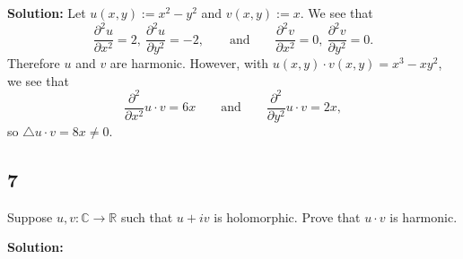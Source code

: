 \documentclass[12pt]{article}
\begin{document}
{\bf Solution:} Let $u(x,y) := x^{2} - y^{2}$ and $v(x,y) := x$. We see that 
\[ \frac{\partial^{2}u}{\partial x^{2}} = 2, \ \frac{\partial^{2}u}{\partial y^{2}} = -2, \qquad \text{and}\qquad 
\frac{\partial^{2}v}{\partial x^{2}} = 0, \ \frac{\partial^{2}v}{\partial y^{2}} = 0. \]
Therefore $u$ and $v$ are harmonic. However, with $u(x,y)\cdot v(x,y) = x^{3} - xy^{2}$, we see that
\[ \frac{\partial^{2}}{\partial x^{2}}u\cdot v = 6x \qquad \text{and}\qquad \frac{\partial^{2}}{\partial y^{2}}u\cdot v = 2x, \]
so $\triangle u\cdot v = 8x \neq 0$.



\subsection*{7}
Suppose $u,v : \mathbb{C} \rightarrow \mathbb{R}$ such that $u + iv$ is holomorphic. Prove that $u\cdot v$ is harmonic.

{\bf Solution:}
\end{document}
